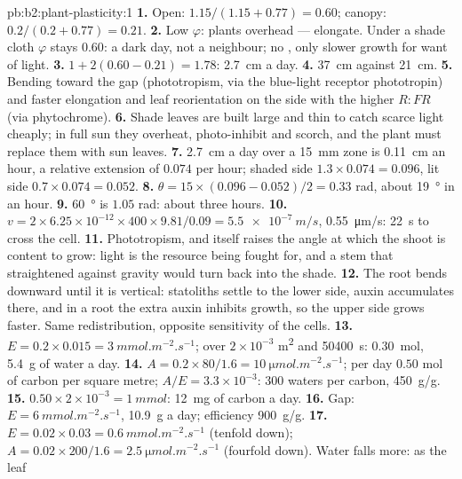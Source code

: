 \begin{solution}{pb:b2:plant-plasticity:1}
\textbf{1.} Open: $1.15/(1.15 + 0.77) = 0.60$; canopy: $0.2/(0.2 +
0.77) = 0.21$.
\textbf{2.} Low $\varphi$: plants overhead --- elongate. Under a
shade cloth $\varphi$ stays $0.60$: a dark day, not a neighbour; no
, only slower growth for want of light.
\textbf{3.} $1 + 2(0.60 - 0.21) = 1.78$: \qty{2.7}{cm} a day.
\textbf{4.} \qty{37}{cm} against \qty{21}{cm}.
\textbf{5.} Bending toward the gap (phototropism, via the blue-light
receptor phototropin) and faster elongation and leaf reorientation
on the side with the higher $R{:}FR$ (via phytochrome).
\textbf{6.} Shade leaves are built large and thin to catch scarce
light cheaply; in full sun they overheat, photo-inhibit and scorch,
and the plant must replace them with sun leaves.
\textbf{7.} \qty{2.7}{cm} a day over a \qty{15}{mm} zone is
\qty{0.11}{cm} an hour, a relative extension of $0.074$ per hour;
shaded side $1.3\times 0.074 = 0.096$, lit side $0.7\times 0.074 =
0.052$.
\textbf{8.} $\theta = 15\times(0.096 - 0.052)/2 = 0.33$ rad, about
\qty{19}{\degree} in an hour.
\textbf{9.} \qty{60}{\degree} is $1.05$ rad: about three hours.
\textbf{10.} $v = 2\times 6.25\times 10^{-12}\times 400\times
9.81/0.09 = \qty{5.5e-7}{m/s}$, \qty{0.55}{\micro m/s}: \qty{22}{s}
to cross the cell.
\textbf{11.} Phototropism, and  itself raises the
angle at which the shoot is content to grow: light is the resource
being fought for, and a stem that straightened against gravity would
turn back into the shade.
\textbf{12.} The root bends downward until it is vertical: statoliths
settle to the lower side, auxin accumulates there, and in a root the
extra auxin inhibits growth, so the upper side grows faster. Same
redistribution, opposite sensitivity of the cells.
\textbf{13.} $E = 0.2\times 0.015 = \qty{3}{mmol.m^{-2}.s^{-1}}$; over
$2\times 10^{-3}$ \unit{m^2} and \qty{50400}{s}: \qty{0.30}{mol},
\qty{5.4}{g} of water a day.
\textbf{14.} $A = 0.2\times 80/1.6 = \qty{10}{\micro mol.m^{-2}.s^{-1}}$;
per day $0.50$ mol of carbon per square metre; $A/E = 3.3\times
10^{-3}$: 300 waters per carbon, \qty{450}{g/g}.
\textbf{15.} $0.50\times 2\times 10^{-3} = \qty{1}{mmol}$: \qty{12}{mg}
of carbon a day.
\textbf{16.} Gap: $E = \qty{6}{mmol.m^{-2}.s^{-1}}$, \qty{10.9}{g} a
day; efficiency \qty{900}{g/g}.
\textbf{17.} $E = 0.02\times 0.03 = \qty{0.6}{mmol.m^{-2}.s^{-1}}$
(tenfold down); $A = 0.02\times 200/1.6 = \qty{2.5}{\micro
mol.m^{-2}.s^{-1}}$ (fourfold down). Water falls more: as the leaf

\end{solution}
